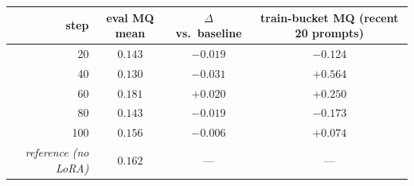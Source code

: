 \begin{tabular}{@{}rccc@{}}
\toprule
step & eval MQ mean & $\Delta$ vs.\ baseline & train-bucket MQ (recent 20 prompts) \\
\midrule
20  & $0.143$ & $-0.019$ & $-0.124$ \\
40  & $0.130$ & $-0.031$ & $+0.564$ \\
60  & $\mathbf{0.181}$ & $\mathbf{+0.020}$ & $+0.250$ \\
80  & $0.143$ & $-0.019$ & $-0.173$ \\
100 & $0.156$ & $-0.006$ & $+0.074$ \\
\midrule
\textit{reference (no LoRA)} & $0.162$ & --- & --- \\
\bottomrule
\end{tabular}

